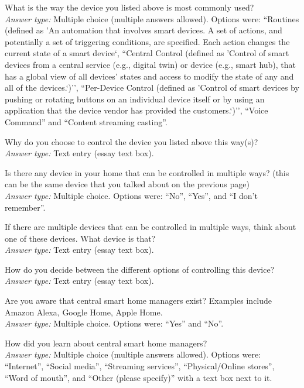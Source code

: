 \printQcounter{} What is the way the device you listed above is most commonly used? \\
\textit{Answer type:} Multiple choice (multiple answers allowed). Options were: ``Routines (defined as 'An automation that involves smart devices. A set of actions, and potentially a set of triggering conditions, are specified. Each action changes the current state of a smart device`, ``Central Control (defined as 'Control of smart devices from a central service (e.g., digital twin) or device (e.g., smart hub), that has a global view of all devices' states and access to modify the state of any and all of the devices.`)'', ``Per-Device Control (defined as 'Control of smart devices by pushing or rotating buttons on an individual device itself or by using an application that the device vendor has provided the customers.`)'', ``Voice Command'' and ``Content streaming casting''.

\printQcounter{} Why do you choose to control the device you listed above this way(s)? \\
\textit{Answer type:} Text entry (essay text box).

 Is there any device in your home that can be controlled in multiple ways? (this can be the same device that you talked about on the previous page)\\
\textit{Answer type:} Multiple choice. Options were: ``No'', ``Yes'', and ``I don't remember''.

 If there are multiple devices that can be controlled in multiple ways, think about one of these devices. What device is that? \\
\textit{Answer type:} Text entry (essay text box).

 How do you decide between the different options of controlling this device? \\
\textit{Answer type:} Text entry (essay text box).

 Are you aware that central smart home managers exist? Examples include Amazon Alexa, Google Home, Apple Home.\\
\textit{Answer type:} Multiple choice. Options were: ``Yes'' and ``No''.

 How did you learn about central smart home managers? \\
\textit{Answer type:} Multiple choice (multiple answers allowed). Options were: ``Internet'', ``Social media'', ``Streaming services'', ``Physical/Online stores'', ``Word of mouth'', and ``Other (please specify)'' with a text box next to it.

